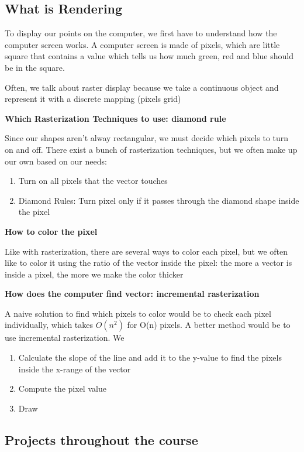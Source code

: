 \documentclass{article}
\begin{document}
\subsection{What is Rendering}

To display our points on the computer, we first have to understand how
the computer screen works. A computer screen is made of pixels, which
are little square that contains a value which tells us how much green,
red and blue should be in the square.

Often, we talk about raster display because we take a continuous object
and represent it with a discrete mapping (pixels grid)

\textbf{Which Rasterization Techniques to use: diamond rule}

Since our shapes aren't alway rectangular, we must decide which pixels
to turn on and off. There exist a bunch of rasterization techniques,
but we often make up our own based on our needs:
\begin{enumerate}
    \item Turn on all pixels that the vector touches
    \item Diamond Rules: Turn pixel only if it passes through the diamond
	shape inside the pixel
\end{enumerate}

\textbf{How to color the pixel}

Like with rasterization, there are several ways to color each pixel,
but we often like to color it using the ratio of the vector inside the
pixel: the more a vector is inside a pixel, the more we make the color
thicker

\textbf{How does the computer find vector: incremental rasterization}

A naive solution to find which pixels to color would be to check each
pixel individually, which takes $O(n^2)$ for O(n) pixels. A better method
would be to use incremental rasterization. We

\begin{enumerate}
    \item Calculate the slope of the line and add it to the y-value to
	find the pixels inside the x-range of the vector
    \item Compute the pixel value
    \item Draw
\end{enumerate}

\subsection{Projects throughout the course}
\end{document}

